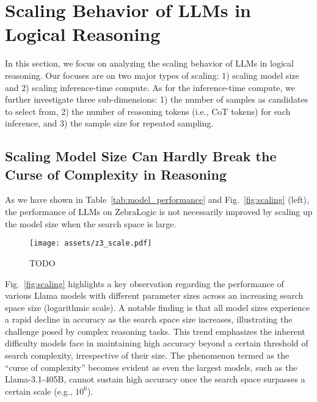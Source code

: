 
\section{Scaling Behavior of LLMs in Logical Reasoning}
\label{sec:discussion}

In this section, we focus on analyzing the scaling behavior of LLMs in logical reasoning. 
Our focuses are on two major types of scaling: 1) scaling model size and 2) scaling inference-time compute.
As for the inference-time compute, we further investigate three sub-dimensions: 1) the number of samples as candidates to select from, 2) the number of reasoning tokens (i.e., CoT tokens) for each inference, and 3) the sample size for repeated sampling.



\subsection{Scaling Model Size Can Hardly Break the Curse of Complexity in Reasoning}
As we have shown in Table~\ref{tab:model_performance} and Fig.~\ref{fig:scaling} (left),  the performance of LLMs on ZebraLogic is not necessarily improved by scaling up the model size when the search space is large.

\begin{figure}[t]
    \centering
    \texttt{[image: assets/z3\_scale.pdf]}
    \vspace{-1mm}
    \caption{
    \small TODO
    }
    \label{fig:z3_scale}
\end{figure}

Fig.~\ref{fig:scaling} highlights a key observation regarding the performance of various Llama models with different parameter sizes across an increasing search space size (logarithmic scale). A notable finding is that all model sizes experience a rapid decline in accuracy as the search space size increases, illustrating the challenge posed by complex reasoning tasks. This trend emphasizes the inherent difficulty models face in maintaining high accuracy beyond a certain threshold of search complexity, irrespective of their size. The phenomenon termed as the ``curse of complexity'' becomes evident as even the largest models, such as the Llama-3.1-405B, cannot sustain high accuracy once the search space surpasses a certain scale (e.g., \(10^6\)).


